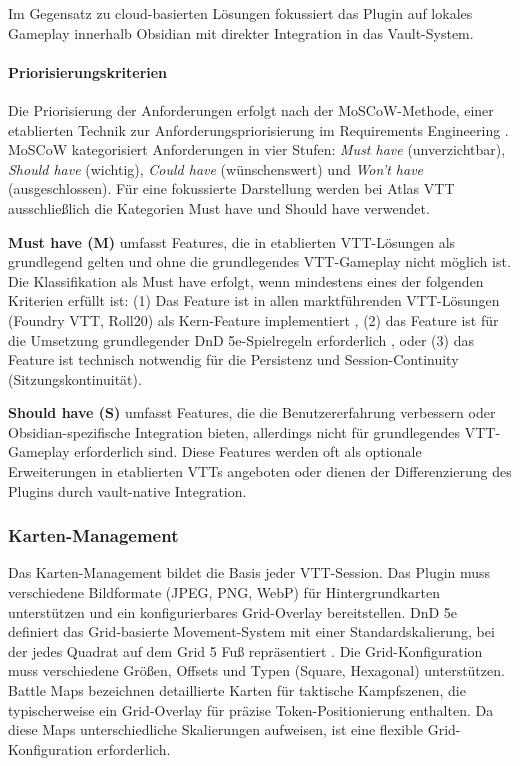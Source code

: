 Im Gegensatz zu cloud-basierten Lösungen fokussiert das Plugin auf lokales Gameplay innerhalb Obsidian mit direkter Integration in das Vault-System.

\paragraph{Priorisierungskriterien}

Die Priorisierung der Anforderungen erfolgt nach der MoSCoW-Methode, einer etablierten Technik zur Anforderungspriorisierung im Requirements Engineering \autocite[S.~375-380]{IIBA2015BABOK}. MoSCoW kategorisiert Anforderungen in vier Stufen: \textit{Must have} (unverzichtbar), \textit{Should have} (wichtig), \textit{Could have} (wünschenswert) und \textit{Won't have} (ausgeschlossen). Für eine fokussierte Darstellung werden bei Atlas \ac{VTT} ausschließlich die Kategorien Must have und Should have verwendet.

\textbf{Must have (M)} umfasst Features, die in etablierten \ac{VTT}-Lösungen als grundlegend gelten und ohne die grundlegendes \ac{VTT}-Gameplay nicht möglich ist. Die Klassifikation als Must have erfolgt, wenn mindestens eines der folgenden Kriterien erfüllt ist: (1) Das Feature ist in allen marktführenden \ac{VTT}-Lösungen (Foundry \ac{VTT}, Roll20) als Kern-Feature implementiert \autocite{FoundryVTT2024,Roll202024}, (2) das Feature ist für die Umsetzung grundlegender \ac{DnD} 5e-Spielregeln erforderlich \autocite{DnDBasicRules2014}, oder (3) das Feature ist technisch notwendig für die Persistenz und Session-Continuity (Sitzungskontinuität).

\textbf{Should have (S)} umfasst Features, die die Benutzererfahrung verbessern oder Obsidian-spezifische Integration bieten, allerdings nicht für grundlegendes \ac{VTT}-Gameplay erforderlich sind. Diese Features werden oft als optionale Erweiterungen in etablierten \ac{VTT}s angeboten oder dienen der Differenzierung des Plugins durch vault-native Integration.

\subsubsection{Karten-Management}

Das Karten-Management bildet die Basis jeder \ac{VTT}-Session. Das Plugin muss verschiedene Bildformate (\ac{JPEG}, \ac{PNG}, \ac{WebP}) für Hintergrundkarten unterstützen und ein konfigurierbares Grid-Overlay bereitstellen. \ac{DnD} 5e definiert das Grid-basierte Movement-System mit einer Standardskalierung, bei der jedes Quadrat auf dem Grid 5 Fuß repräsentiert \autocite{DnDBasicRules2014}. Die Grid-Konfiguration muss verschiedene Größen, Offsets und Typen (Square, Hexagonal) unterstützen. Battle Maps bezeichnen detaillierte Karten für taktische Kampfszenen, die typischerweise ein Grid-Overlay für präzise Token-Positionierung enthalten. Da diese Maps unterschiedliche Skalierungen aufweisen, ist eine flexible Grid-Konfiguration erforderlich.

